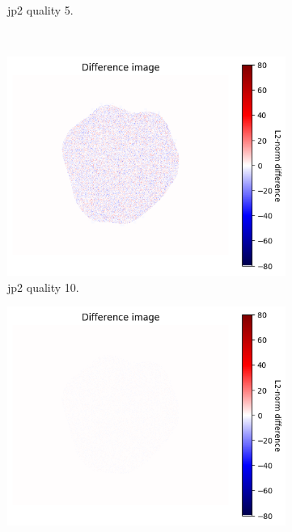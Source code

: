 \begin{figure}[htb]
\begin{subfigure}[b]{0.49\textwidth}
            \caption{\gls{jp2} quality 5.}
            \label{fig:img_quality_heatmap_5}
        \end{subfigure}
        \\
        \begin{subfigure}[b]{0.49\textwidth}
            \centering
            \includegraphics[width=\textwidth]{doc/thesis/0_figures/compare_quality/set1/heatmap/jp2_10_diff_heatmap.png}
            \caption{\gls{jp2} quality 10.}
            \label{fig:img_quality_heatmap_10}
        \end{subfigure}
        \begin{subfigure}[b]{0.49\textwidth}
            \centering
            \includegraphics[width=\textwidth]{doc/thesis/0_figures/compare_quality/set1/heatmap/jp2_100_diff_heatmap.png}

\end{subfigure}
\end{figure}
